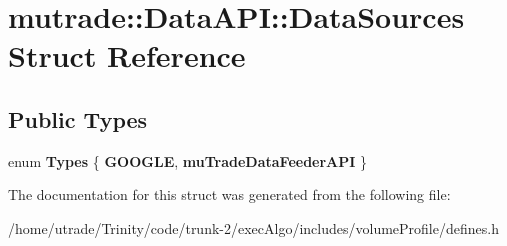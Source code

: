 \hypertarget{structmutrade_1_1_data_a_p_i_1_1_data_sources}{\section{mutrade\-:\-:Data\-A\-P\-I\-:\-:Data\-Sources Struct Reference}
\label{structmutrade_1_1_data_a_p_i_1_1_data_sources}
}
\subsection*{Public Types}
\begin{DoxyCompactItemize}
\item 
enum {\bfseries Types} \{ {\bfseries G\-O\-O\-G\-L\-E}, 
{\bfseries mu\-Trade\-Data\-Feeder\-A\-P\-I}
 \}
\end{DoxyCompactItemize}


The documentation for this struct was generated from the following file\-:\begin{DoxyCompactItemize}
\item 
/home/utrade/\-Trinity/code/trunk-\/2/exec\-Algo/includes/volume\-Profile/defines.\-h\end{DoxyCompactItemize}
